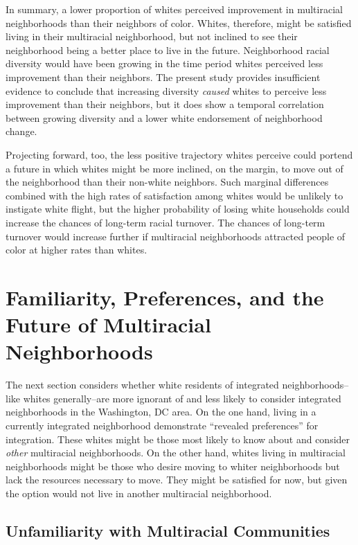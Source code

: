\documentclass{baderart}
\begin{document}
In summary, a lower proportion of whites perceived improvement in multiracial neighborhoods than their neighbors of color. Whites, therefore, might be satisfied living in their multiracial neighborhood, but not inclined to see their neighborhood being a better place to live in the future. Neighborhood racial diversity would have been growing in the time period whites perceived less improvement than their neighbors. The present study provides insufficient evidence to conclude that increasing diversity \emph{caused} whites to perceive less improvement than their neighbors, but it does show a temporal correlation between growing diversity and a lower white endorsement of neighborhood change.

Projecting forward, too, the less positive trajectory whites perceive could portend a future in which whites might be more inclined, on the margin, to move out of the neighborhood than their non-white neighbors. Such marginal differences combined with the high rates of satisfaction among whites would be unlikely to instigate white flight, but the higher probability of losing white households could increase the chances of long-term racial turnover. The chances of long-term turnover would increase further if multiracial neighborhoods attracted people of color at higher rates than whites.

\section{Familiarity, Preferences, and the Future of Multiracial Neighborhoods}

The next section considers whether white residents of integrated neighborhoods--like whites generally--are more ignorant of and less likely to consider integrated neighborhoods in the Washington, DC area. On the one hand, living in a currently integrated neighborhood demonstrate ``revealed preferences'' for integration. These whites might be those most likely to know about and consider \emph{other} multiracial neighborhoods. On the other hand, whites living in multiracial neighborhoods might be those who desire moving to whiter neighborhoods but lack the resources necessary to move. They might be satisfied for now, but given the option would not live in another multiracial neighborhood.

\subsection{Unfamiliarity with Multiracial Communities}\label{unfamiliarity-with-multiracial-communities}
\end{document}
